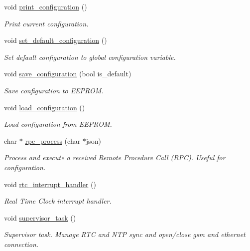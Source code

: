 \begin{DoxyCompactItemize}
void \hyperlink{rmap_8ino_a65b2dadc0411e43874ec8ed7f73bc62a}{print\+\_\+configuration} ()
\begin{DoxyCompactList}\small\item\em Print current configuration. \end{DoxyCompactList}\item 
void \hyperlink{rmap_8ino_a951e4934b8add405b8fe45417fc380f5}{set\+\_\+default\+\_\+configuration} ()
\begin{DoxyCompactList}\small\item\em Set default configuration to global configuration variable. \end{DoxyCompactList}\item 
void \hyperlink{rmap_8ino_afa979a8cb238fe81bf20654dfd6096ef}{save\+\_\+configuration} (bool is\+\_\+default)
\begin{DoxyCompactList}\small\item\em Save configuration to E\+E\+P\+R\+OM. \end{DoxyCompactList}\item 
void \hyperlink{rmap_8ino_a32a64a2800c724fb28e10636f2ec20b9}{load\+\_\+configuration} ()
\begin{DoxyCompactList}\small\item\em Load configuration from E\+E\+P\+R\+OM. \end{DoxyCompactList}\item 
char $\ast$ \hyperlink{rmap_8ino_a99f56f4c38f64be47b52818cbf57bb2d}{rpc\+\_\+process} (char $\ast$json)
\begin{DoxyCompactList}\small\item\em Process and execute a received Remote Procedure Call (R\+PC). Useful for configuration. \end{DoxyCompactList}\item 
void \hyperlink{rmap_8ino_a17374e428acd4fc86f2b8a8ede54deca}{rtc\+\_\+interrupt\+\_\+handler} ()
\begin{DoxyCompactList}\small\item\em Real Time Clock interrupt handler. \end{DoxyCompactList}\item 
void \hyperlink{rmap_8ino_a2f44f14407ed3f1ae93126c1533e697b}{supervisor\+\_\+task} ()
\begin{DoxyCompactList}\small\item\em Supervisor task. Manage R\+TC and N\+TP sync and open/close gsm and ethernet connection. \end{DoxyCompactList}\item 

\end{DoxyCompactItemize}
